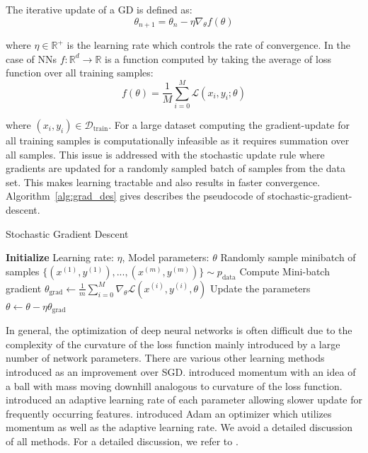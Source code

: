 The iterative update of a GD is defined as:
\begin{equation}
    \label{eq:gradupdate}
    \theta_{n+1} = \theta_{n} - \eta \nabla_{\theta}f(\theta)
\end{equation}

where $\eta\in\mathbb{R}^+$ is the learning rate which controls the rate of convergence. In the case of NNs $f:\mathbb{R}^{d}\rightarrow \mathbb{R}$ is a function computed by taking the average of loss function over all training samples:
\begin{equation}
    f(\theta) = \frac{1}{M}\sum_{i=0}^M\mathcal{L}(x_i, y_i;\theta)
\end{equation}

where $(x_i,y_i)\in\mathcal{D}_\text{train}$. For a large dataset computing the gradient-update for all training samples is computationally infeasible as it requires summation over all samples. This issue is addressed with the stochastic update rule where gradients are updated for a randomly sampled batch of samples from the data set. This makes learning tractable and also results in faster convergence. Algorithm~\ref{alg:grad_des} gives describes the pseudocode of stochastic-gradient-descent.

\begin{algorithm}
\caption{Stochastic Gradient Descent}
\label{alg:grad_des}
\begin{algorithmic}
\State \textbf{Initialize} Learning rate: $\eta$, Model parameters: $\theta$
\Repeat
\State Randomly sample minibatch of samples $\{(x^{(1)},y^{(1)}),...,(x^{(m)},y^{(m)})\}\sim p_\text{data}$ 
\State Compute Mini-batch gradient $\theta_\text{grad} \leftarrow \frac{1}{m}\sum_{i=0}^M \nabla_{\theta}\mathcal{L}(x^{(i)}, y^{(i)},\theta)$
\State Update the parameters $\theta\leftarrow\theta - \eta \theta_\text{grad}$
\State
\end{algorithmic}
\end{algorithm}
In general, the optimization of deep neural networks is often difficult due to the complexity of the curvature of the loss function mainly introduced by a large number of network parameters. There are various other learning methods introduced as an improvement over SGD. \citet{qian1999momentum} introduced momentum with an idea of a ball with mass moving downhill analogous to curvature of the loss function. \citet{duchi2011adaptive} introduced an adaptive learning rate of each parameter allowing slower update for frequently occurring features. \citet{kingma2014adam} introduced Adam an optimizer which utilizes momentum as well as the adaptive learning rate.
We avoid a detailed discussion of all methods. For a detailed discussion, we refer to \citet{Goodfellow-et-al-2016}.


